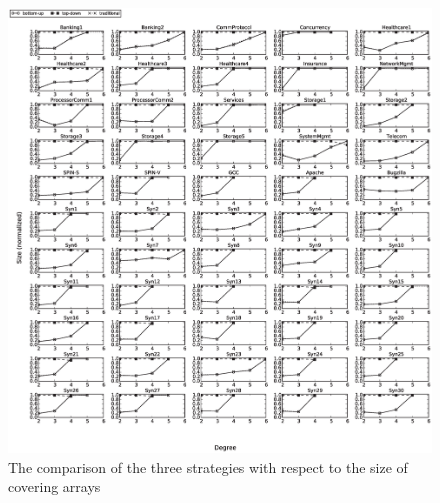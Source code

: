 \documentclass[conference]{IEEEtran}
\theoremstyle{definition}
\begin{document}


\begin{figure}[htbp]
\center
 \includegraphics[width=7.4in]{size.eps}
\caption{The comparison of the three strategies with respect to the size of covering arrays}
\label{experiement}
\end{figure}
\end{document}
